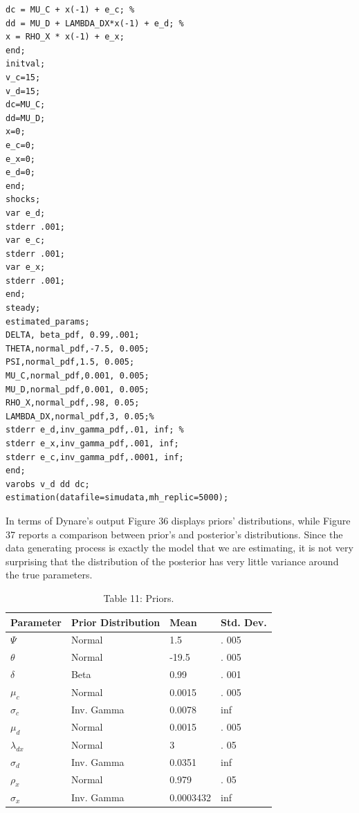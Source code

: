 \documentclass[10pt]{article}
\begin{document}
\begin{verbatim}
dc = MU_C + x(-1) + e_c; %
dd = MU_D + LAMBDA_DX*x(-1) + e_d; %
x = RHO_X * x(-1) + e_x;
end;
initval;
v_c=15;
v_d=15;
dc=MU_C;
dd=MU_D;
x=0;
e_c=0;
e_x=0;
e_d=0;
end;
shocks;
var e_d;
stderr .001;
var e_c;
stderr .001;
var e_x;
stderr .001;
end;
steady;
estimated_params;
DELTA, beta_pdf, 0.99,.001;
THETA,normal_pdf,-7.5, 0.005;
PSI,normal_pdf,1.5, 0.005;
MU_C,normal_pdf,0.001, 0.005;
MU_D,normal_pdf,0.001, 0.005;
RHO_X,normal_pdf,.98, 0.05;
LAMBDA_DX,normal_pdf,3, 0.05;%
stderr e_d,inv_gamma_pdf,.01, inf; %
stderr e_x,inv_gamma_pdf,.001, inf;
stderr e_c,inv_gamma_pdf,.0001, inf;
end;
varobs v_d dd dc;
estimation(datafile=simudata,mh_replic=5000);
\end{verbatim}

In terms of Dynare's output Figure 36 displays priors' distributions, while Figure 37 reports a comparison between prior's and posterior's distributions. Since the data generating process is exactly the model that we are estimating, it is not very surprising that the distribution of the posterior has very little variance around the true parameters.

\begin{table}[h]
\begin{center}
\begin{tabular}{|l|l|l|l|}
\hline
Parameter & Prior Distribution & Mean & Std. Dev. \\
\hline
$\Psi$ & Normal & 1.5 & . 005 \\
\hline
$\theta$ & Normal & -19.5 & . 005 \\
\hline
$\delta$ & Beta & 0.99 & . 001 \\
\hline
$\mu_{c}$ & Normal & 0.0015 & . 005 \\
\hline
$\sigma_{c}$ & Inv. Gamma & 0.0078 & inf \\
\hline
$\mu_{d}$ & Normal & 0.0015 & . 005 \\
\hline
$\lambda_{d x}$ & Normal & 3 & . 05 \\
\hline
$\sigma_{d}$ & Inv. Gamma & 0.0351 & inf \\
\hline
$\rho_{x}$ & Normal & 0.979 & . 05 \\
\hline
$\sigma_{x}$ & Inv. Gamma & 0.0003432 & inf \\
\hline
\end{tabular}
\captionsetup{labelformat=empty}
\caption{Table 11: Priors.}
\end{center}
\end{table}
\end{document}
